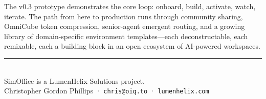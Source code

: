 \documentclass[11pt,letterpaper]{article}
\begin{document}
The v0.3 prototype demonstrates the core loop: onboard, build, activate, watch, iterate. The path from here to production runs through community sharing, OmniCube token compression, senior-agent emergent routing, and a growing library of domain-specific environment templates---each deconstructable, each remixable, each a building block in an open ecosystem of AI-powered workspaces.

\vspace{1em}
\begin{center}
\textcolor{accent}{\rule{0.4\textwidth}{0.5pt}}\\[8pt]
{\small\textcolor{muted}{SimOffice is a LumenHelix Solutions project.\\
Christopher Gordon Phillips · \texttt{chris@oiq.to} · \texttt{lumenhelix.com}}}
\end{center}
\end{document}
